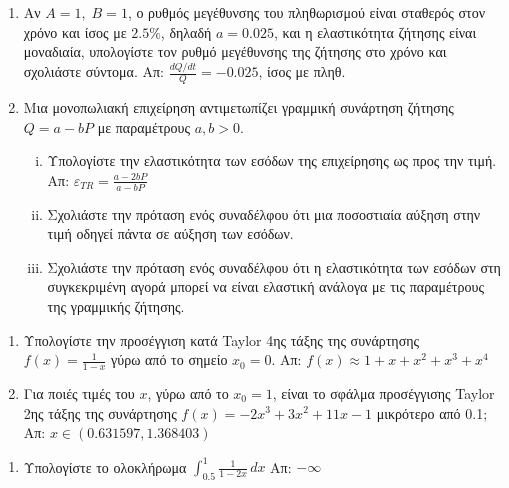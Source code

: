 \begin{enumerate}
  \item Αν $ A=1, \; B=1 $, ο ρυθμός μεγέθυνσης του πληθωρισμού είναι σταθερός στον
    χρόνο και ίσος με $ 2.5\% $, δηλαδή $ a=0.025 $, και η ελαστικότητα ζήτησης είναι
    μοναδιαία, υπολογίστε τον ρυθμό μεγέθυνσης της ζήτησης στο χρόνο και σχολιάστε
    σύντομα. 
    \hfill Απ: $ \frac{dQ/dt}{Q} = -0.025 $, ίσος με πληθ. 
  \item Μια μονοπωλιακή επιχείρηση αντιμετωπίζει γραμμική συνάρτηση ζήτησης $ Q = a-bP $ 
    με παραμέτρους $ a,b>0 $. 
    \begin{enumerate}[i)]
      \item Υπολογίστε την ελαστικότητα των εσόδων της επιχείρησης ως
        προς την τιμή.
        \hfill Απ: $ \varepsilon _{TR} = \frac{a-2bP}{a-bP} $ 
      \item Σχολιάστε την πρόταση ενός συναδέλφου ότι μια ποσοστιαία αύξηση στην τιμή
        οδηγεί πάντα σε αύξηση των εσόδων.
      \item Σχολιάστε την πρόταση ενός συναδέλφου ότι η ελαστικότητα των εσόδων στη
        συγκεκριμένη αγορά μπορεί να είναι ελαστική ανάλογα με τις παραμέτρους της
        γραμμικής ζήτησης.
    \end{enumerate}
\end{enumerate}

\begin{center}
  \minibox{\large\bfseries \textcolor{Col1}{Taylor}}
\end{center}

\vspace{\baselineskip}

\begin{enumerate}
  \item Υπολογίστε την προσέγγιση κατά Taylor 4ης τάξης της συνάρτησης $ f(x) =
    \frac{1}{1-x} $ γύρω από το σημείο $ x_{0}=0 $. \hfill Απ: $ f(x) \approx
    1+x+x^{2}+x^{3}+x^{4} $ 
  \item Για ποιές τιμές του $ x $, γύρω από το $ x_{0}=1 $, είναι το σφάλμα προσέγγισης
    Taylor 2ης τάξης της συνάρτησης $ f(x)=-2x^{3}+3x^{2}+11x-1 $ μικρότερο από 0.1;
    \hfill Απ: $ x \in (0.631597,1.368403) $ 
\end{enumerate}

\begin{center}
  \minibox{\large\bfseries \textcolor{Col1}{Ολοκληρώματα}}
\end{center}

\begin{enumerate}
  \item Υπολογίστε το ολοκλήρωμα $ \int _{0.5}^{1} \frac{1}{1-2x} \,{dx} $ 
    \hfill Απ: $ - \infty $ 
\end{enumerate}

